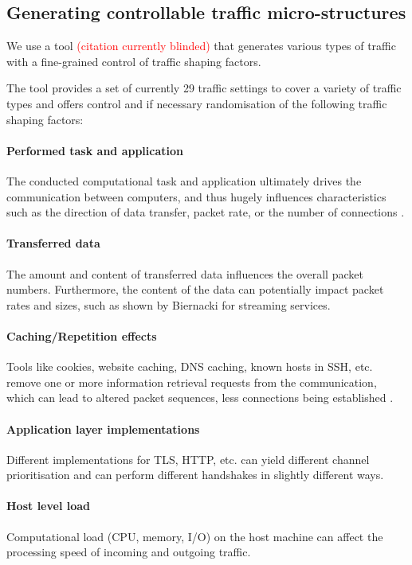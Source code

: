 \documentclass[conference]{IEEEtran}
\begin{document}
\subsection{Generating controllable traffic micro-structures}

We use a tool \textcolor{red}{(citation currently blinded)} that generates various types of traffic with a fine-grained control of traffic shaping factors. 

The tool provides a set of currently 29 traffic settings to cover a variety of traffic types and offers control and if necessary randomisation of the following traffic shaping factors:

 
\paragraph{Performed task and application}
The conducted computational task and application ultimately drives the communication between computers, and thus hugely influences characteristics such as the direction of data transfer, packet rate, or the number of connections \cite{stober2013you}.

\paragraph{Transferred data} 
The amount and content of transferred data influences the overall packet numbers. Furthermore, the content of the data can potentially impact packet rates and sizes, such as shown by Biernacki \cite{biernacki2017analysis} for streaming services.


\paragraph{Caching/Repetition effects}
Tools like cookies, website caching, DNS caching, known hosts in SSH, etc. remove one or more information retrieval requests from the communication, which can lead to altered packet sequences, less connections being established \cite{fricker2012impact}.


\paragraph{Application layer implementations}
Different implementations for TLS, HTTP, etc. can yield different channel prioritisation and can perform different handshakes in slightly different ways.


\paragraph{Host level load}
Computational load (CPU, memory, I/O) on the host machine can affect the processing speed of incoming and outgoing traffic.
\end{document}
